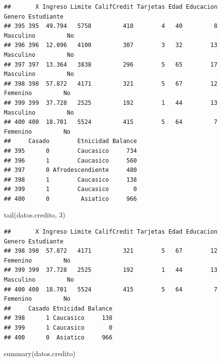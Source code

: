 \documentclass[
  12pt,
]{book}
\newenvironment{Shaded}{\begin{snugshade}}{\end{snugshade}}
\newcommand{\DecValTok}[1]{\textcolor[rgb]{0.00,0.00,0.81}{#1}}
\newcommand{\FunctionTok}[1]{\textcolor[rgb]{0.00,0.00,0.00}{#1}}
\newcommand{\NormalTok}[1]{#1}
\begin{document}
\begin{verbatim}
##       X Ingreso Limite CalifCredit Tarjetas Edad Educacion    Genero Estudiante
## 395 395  49.794   5758         410        4   40         8 Masculino         No
## 396 396  12.096   4100         307        3   32        13 Masculino         No
## 397 397  13.364   3838         296        5   65        17 Masculino         No
## 398 398  57.872   4171         321        5   67        12  Femenino         No
## 399 399  37.728   2525         192        1   44        13 Masculino         No
## 400 400  18.701   5524         415        5   64         7  Femenino         No
##     Casado        Etnicidad Balance
## 395      0        Caucasico     734
## 396      1        Caucasico     560
## 397      0 Afrodescendiente     480
## 398      1        Caucasico     138
## 399      1        Caucasico       0
## 400      0         Asiatico     966
\end{verbatim}

\begin{Shaded}
\begin{Highlighting}[]
\FunctionTok{tail}\NormalTok{(datos.credito, }\DecValTok{3}\NormalTok{)}
\end{Highlighting}
\end{Shaded}

\begin{verbatim}
##       X Ingreso Limite CalifCredit Tarjetas Edad Educacion    Genero Estudiante
## 398 398  57.872   4171         321        5   67        12  Femenino         No
## 399 399  37.728   2525         192        1   44        13 Masculino         No
## 400 400  18.701   5524         415        5   64         7  Femenino         No
##     Casado Etnicidad Balance
## 398      1 Caucasico     138
## 399      1 Caucasico       0
## 400      0  Asiatico     966
\end{verbatim}

\begin{Shaded}
\begin{Highlighting}[]
\FunctionTok{summary}\NormalTok{(datos.credito)}
\end{Highlighting}
\end{Shaded}
\end{document}
